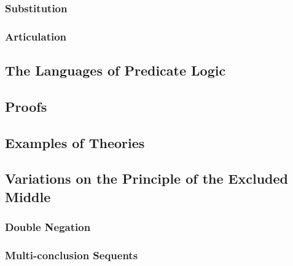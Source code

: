 \subsubsection{Substitution}
\subsubsection{Articulation}


\subsection{The Languages of Predicate Logic}


\subsection{Proofs}


\subsection{Examples of Theories}


\subsection{Variations on the Principle of the Excluded Middle}
\subsubsection{Double Negation}
\subsubsection{Multi-conclusion Sequents}

\appendix







